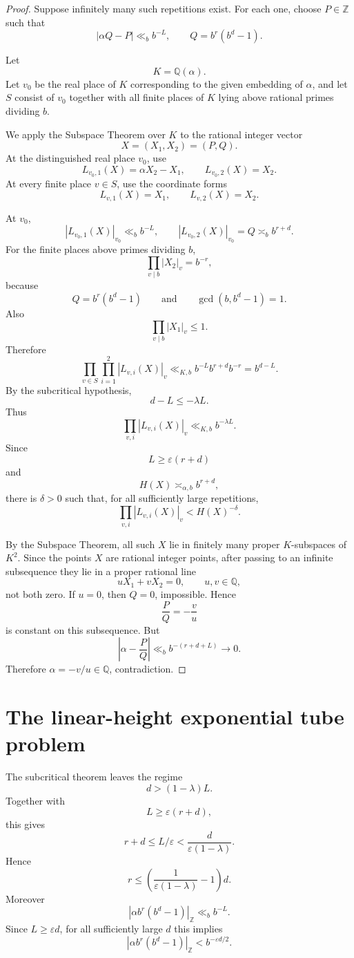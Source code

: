 \documentclass[11pt]{amsart}
\newcommand{\normZ}[1]{\left|#1\right|_{\mathbb Z}}
\begin{document}
\begin{proof}
Suppose infinitely many such repetitions exist. For each one, choose \(P\in\mathbb Z\) such that
\[
|\alpha Q-P|\ll_b b^{-L},
\qquad
Q=b^r(b^d-1).
\]

Let
\[
K=\mathbb Q(\alpha).
\]
Let \(v_0\) be the real place of \(K\) corresponding to the given embedding of \(\alpha\), and let \(S\) consist of \(v_0\) together with all finite places of \(K\) lying above rational primes dividing \(b\).

We apply the Subspace Theorem over \(K\) to the rational integer vector
\[
X=(X_1,X_2)=(P,Q).
\]
At the distinguished real place \(v_0\), use
\[
L_{v_0,1}(X)=\alpha X_2-X_1,
\qquad
L_{v_0,2}(X)=X_2.
\]
At every finite place \(v\in S\), use the coordinate forms
\[
L_{v,1}(X)=X_1,
\qquad
L_{v,2}(X)=X_2.
\]

At \(v_0\),
\[
|L_{v_0,1}(X)|_{v_0}\ll_b b^{-L},
\qquad
|L_{v_0,2}(X)|_{v_0}=Q\asymp_b b^{r+d}.
\]
For the finite places above primes dividing \(b\),
\[
\prod_{v\mid b}|X_2|_v=b^{-r},
\]
because
\[
Q=b^r(b^d-1)
\qquad\text{and}\qquad
\gcd(b,b^d-1)=1.
\]
Also
\[
\prod_{v\mid b}|X_1|_v\leq 1.
\]
Therefore
\[
\prod_{v\in S}\prod_{i=1}^2
|L_{v,i}(X)|_v
\ll_{K,b}
b^{-L}b^{r+d}b^{-r}
=
b^{d-L}.
\]
By the subcritical hypothesis,
\[
d-L\leq-\lambda L.
\]
Thus
\[
\prod_{v,i}|L_{v,i}(X)|_v
\ll_{K,b}
b^{-\lambda L}.
\]
Since
\[
L\geq\varepsilon(r+d)
\]
and
\[
H(X)\asymp_{\alpha,b} b^{r+d},
\]
there is \(\delta>0\) such that, for all sufficiently large repetitions,
\[
\prod_{v,i}|L_{v,i}(X)|_v
<
H(X)^{-\delta}.
\]

By the Subspace Theorem, all such \(X\) lie in finitely many proper \(K\)-subspaces of \(K^2\). Since the points \(X\) are rational integer points, after passing to an infinite subsequence they lie in a proper rational line
\[
uX_1+vX_2=0,
\qquad
u,v\in\mathbb Q,
\]
not both zero. If \(u=0\), then \(Q=0\), impossible. Hence
\[
\frac{P}{Q}=-\frac{v}{u}
\]
is constant on this subsequence. But
\[
\left|\alpha-\frac{P}{Q}\right|
\ll_b
b^{-(r+d+L)}
\to0.
\]
Therefore \(\alpha=-v/u\in\mathbb Q\), contradiction.
\end{proof}

\section{The linear-height exponential tube problem}

The subcritical theorem leaves the regime
\[
d>(1-\lambda)L.
\]
Together with
\[
L\geq\varepsilon(r+d),
\]
this gives
\[
r+d\leq L/\varepsilon < \frac{d}{\varepsilon(1-\lambda)}.
\]
Hence
\[
r\leq
\left(\frac{1}{\varepsilon(1-\lambda)}-1\right)d.
\]
Moreover
\[
\normZ{\alpha b^r(b^d-1)}\ll_b b^{-L}.
\]
Since \(L\geq\varepsilon d\), for all sufficiently large \(d\) this implies
\[
\normZ{\alpha b^r(b^d-1)}<b^{-\varepsilon d/2}.
\]
\end{document}
